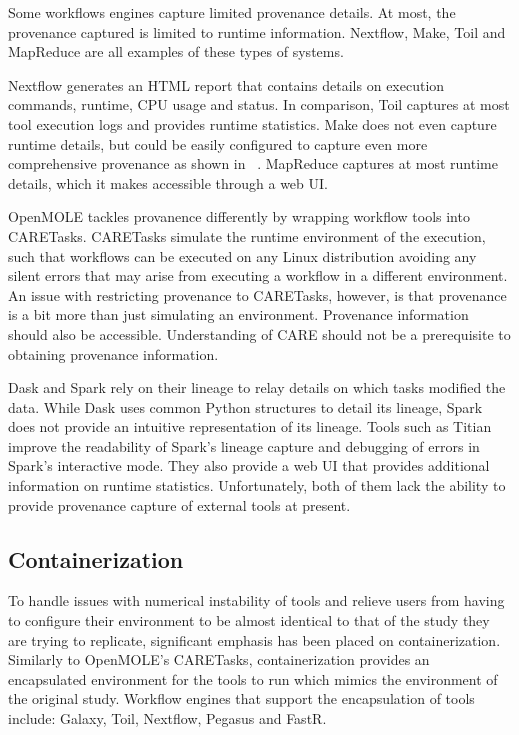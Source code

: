             Some workflows engines capture limited provenance details. At most,
            the provenance captured is limited to runtime information. Nextflow,
            Make, Toil and MapReduce are all examples of these types of systems.

            Nextflow generates an HTML report that contains details on execution
            commands, runtime, CPU usage and status. In comparison, Toil
            captures at most tool execution logs and provides runtime
            statistics. Make does not even capture runtime details, but could be
            easily configured to capture even more comprehensive provenance as
            shown in ~\cite{10.3389/fninf.2016.00002}. MapReduce captures at
            most runtime details, which it makes accessible through a web UI.

            OpenMOLE tackles provanence differently by wrapping workflow tools
            into CARETasks. CARETasks simulate the runtime environment of the
            execution, such that workflows can be executed on any Linux
            distribution avoiding any silent errors that may arise from
            executing a workflow in a different environment. An issue with
            restricting provenance to CARETasks, however, is that provenance is
            a bit more than just simulating an environment. Provenance
            information should also be accessible. Understanding of CARE should
            not be a prerequisite to obtaining provenance information.
                     
            Dask and Spark rely on their lineage to relay details on which tasks
            modified the data. While Dask uses common Python structures to
            detail its lineage, Spark does not provide an intuitive
            representation of its lineage. Tools such as
            Titian~\cite{interlandi2018adding} improve the readability of
            Spark's lineage capture and  debugging of errors in Spark's
            interactive mode. They also provide a web UI that provides
            additional information on runtime statistics. Unfortunately, both of
            them lack the ability to provide provenance capture of external
            tools at present.

        \subsection{Containerization}\label{repcont}

            To handle issues with numerical instability of tools and relieve
            users from having to configure their environment to be almost
            identical to that of the study they are trying to replicate,
            significant emphasis has been placed on containerization. Similarly
            to OpenMOLE's CARETasks, containerization provides an encapsulated
            environment for the tools to run which mimics the environment of the
            original study. Workflow engines that support the encapsulation of
            tools include: Galaxy, Toil, Nextflow, Pegasus and FastR. 

